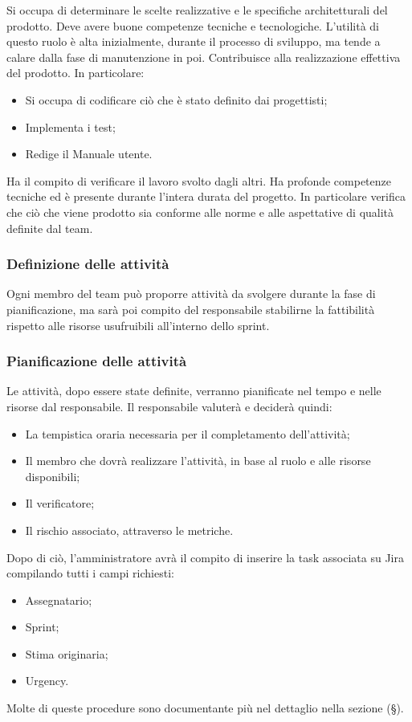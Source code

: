 \documentclass[10pt, a4paper]{article}
\begin{document}
Si occupa di determinare le scelte realizzative e le specifiche architetturali del prodotto. Deve avere buone competenze tecniche e tecnologiche. L'utilità di questo ruolo è alta inizialmente, durante il processo di sviluppo, ma tende a calare dalla fase di manutenzione in poi.
Contribuisce alla realizzazione effettiva del prodotto.
In particolare:
\begin{itemize}
    \item Si occupa di codificare ciò che è stato definito dai progettisti;
    \item Implementa i test;
    \item Redige il Manuale utente.
\end{itemize}
Ha il compito di verificare il lavoro svolto dagli altri.
Ha profonde competenze tecniche ed è presente durante l'intera durata del progetto.
In particolare verifica che ciò che viene prodotto sia conforme alle norme e alle aspettative di qualità definite dal team.

\subsubsection{Definizione delle attività}
Ogni membro del team può proporre attività da svolgere durante la fase di pianificazione, ma sarà poi compito del responsabile stabilirne la fattibilità rispetto alle risorse usufruibili all'interno dello sprint.
\subsubsection{Pianificazione delle attività}
Le attività, dopo essere state definite, verranno pianificate nel tempo e nelle risorse dal responsabile. Il responsabile valuterà e deciderà quindi:
\begin{itemize}
    \item La tempistica oraria necessaria per il completamento dell'attività;
    \item Il membro che dovrà realizzare l'attività, in base al ruolo e alle risorse disponibili;
    \item Il verificatore;
    \item Il rischio associato, attraverso le metriche.
\end{itemize}
Dopo di ciò, l'amministratore avrà il compito di inserire la task associata su Jira compilando tutti i campi richiesti:
\begin{itemize}
    \item Assegnatario;
    \item Sprint;
    \item Stima originaria;
    \item Urgency.
\end{itemize}
Molte di queste procedure sono documentante più nel dettaglio nella sezione (\S {}).
\end{document}
